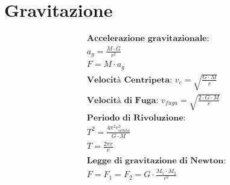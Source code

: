 \section{Gravitazione}

\begin{gather*}
    \textbf{Accelerazione gravitazionale: } \\ a_g = \frac{M\cdot G}{r^2} \\
    F = M \cdot a_g \\
    \textbf{Velocità Centripeta: } v_c= \sqrt{\frac{G \cdot M}{r}} \\
    \textbf{Velocità di Fuga: } v_{fuga}=\sqrt{\frac{2 \cdot G \cdot M}{r}} \\
    \textbf{Periodo di Rivoluzione}: \\ T^2 = \frac{4 \pi^2 r^3_{orbita}}{G \cdot M} \\ T = \frac{2 \pi r}{v_{}}\\
    \textbf{Legge di gravitazione di Newton}: \\ F=F_1=F_2 = G\cdot\frac{M_1\cdot M_2}{r^2}
\end{gather*}